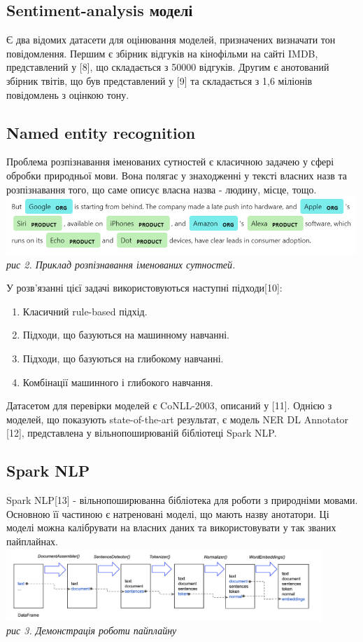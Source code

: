 \subsection{Sentiment-analysis моделі}
Є два відомих датасети для оцінювання моделей, призначених визначати тон повідомлення. Першим є збірник відгуків на кінофільми на сайті IMDB, представлений у [8], що складається з 50000 відгуків.  Другим є анотований збірник твітів, що був представлений у [9] та складається з 1,6 міліонів повідомлень з оцінкою тону.
\subsection{Named entity recognition}
Проблема розпізнавання іменованих сутностей є класичною задачею у сфері обробки природньої мови. Вона полягає у знаходженні у тексті власних назв та розпізнавання того, що саме описує власна назва - людину, місце, тощо. \\
\includegraphics[width = 500]{Dissertation/ner-example.png}\\
\textit{рис 2. Приклад розпізнавання іменованих сутностей.}


У розв'язанні цієї задачі використовуються наступні підходи[10]:
\begin{enumerate}
\item Класичний rule-based підхід.
\item Підходи, що базуються на машинному навчанні.
\item Підходи, що базуються на глибокому навчанні.
\item Комбінації машинного і глибокого навчання. 
\end{enumerate}
Датасетом для перевірки моделей є CoNLL-2003, описаний у [11]. Однією з моделей, що показують state-of-the-art результат, є модель NER DL Annotator [12], представлена у вільнопоширюваній бібліотеці Spark NLP.
\subsection{Spark NLP}
Spark NLP[13] - вільнопоширюванна бібліотека для роботи з природніми мовами. Основною її частиною є натреновані моделі, що мають назву анотатори. Ці моделі можна калібрувати на власних даних та використовувати у так званих пайплайнах.\\
\includegraphics[width = 450]{Dissertation/spark_nlp.png}\\
\textit{рис 3. Демонстрація роботи пайплайну}

